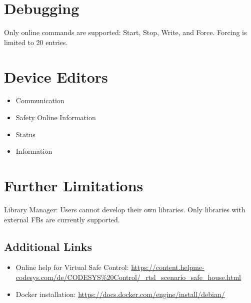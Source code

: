 \documentclass[a4paper,12pt]{article}
\begin{document}
\section{Debugging}

Only online commands are supported: Start, Stop, Write, and Force. Forcing is limited to 20 entries.

\section{Device Editors}
\begin{itemize}
	\item Communication
	\item Safety Online Information
	\item Status
	\item Information
\end{itemize}

\section*{Further Limitations}

Library Manager: Users cannot develop their own libraries. Only libraries with external FBs are currently supported.

\subsection{Additional Links}
\begin{itemize}
	\item Online help for Virtual Safe Control: \url{https://content.helpme-codesys.com/de/CODESYS%20Control/_rtsl_scenario_safe_house.html}
	\item Docker installation: \url{https://docs.docker.com/engine/install/debian/}
\end{itemize}
\end{document}
